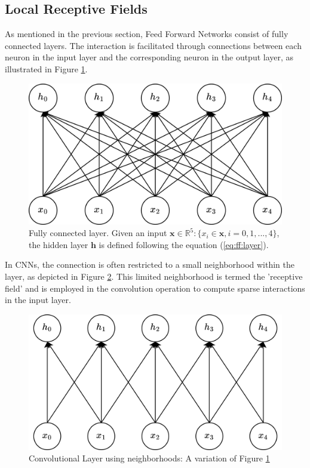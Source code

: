 \subsection{Local Receptive Fields}
As mentioned in the previous section, Feed Forward Networks consist of fully connected layers. The interaction is facilitated through connections between each neuron in the input layer and the corresponding neuron in the output layer, as illustrated in Figure \ref{fig:ff}. 
\begin{figure}[htb]
    \centering
    \includegraphics[width=0.5\linewidth]{figures/chapters-imgs/20/ff-net.jpg}
    \caption[Fully connected layer.]{Fully connected layer. Given an input $\boldsymbol{x} \in \mathbb{R}^{5}:\{x_{i}\in\boldsymbol{x},i=0,1,...,4\}$, the hidden layer $\boldsymbol{h}$ is defined following the equation (\ref{eq:ff:layer}).}
    \label{fig:ff}
\end{figure}

In CNNs, the connection is often restricted to a small neighborhood within the layer, as depicted in Figure \ref{fig:neighbourhood}. This limited neighborhood is termed the 'receptive field' and is employed in the convolution operation to compute sparse interactions in the input layer.
\begin{figure}[htb]
    \centering
    \includegraphics[width=0.5\linewidth]{figures/chapters-imgs/20/neighbourhood.jpg}
    \caption[Neighbourhood Convolutional Layer]{Convolutional Layer using neighborhoods: A variation of Figure \ref{fig:ff}}
    \label{fig:neighbourhood}
\end{figure}

